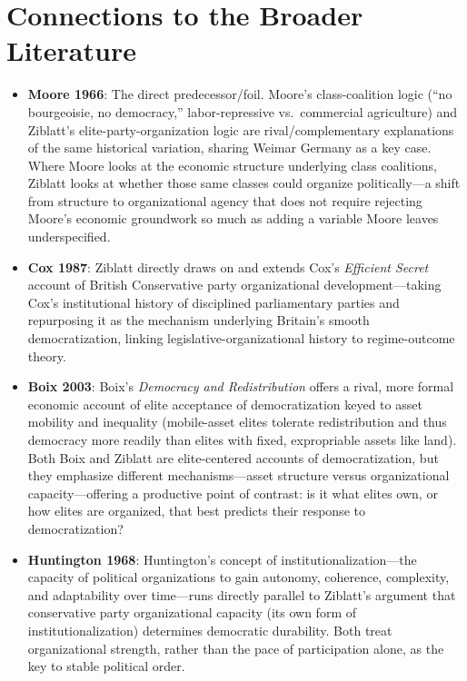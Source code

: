 \documentclass[12pt]{article}
\begin{document}
\section{Connections to the Broader Literature}

\begin{itemize}[leftmargin=*, itemsep=4pt]
    \item \textbf{Moore 1966}: The direct predecessor/foil. Moore's class-coalition logic (``no bourgeoisie, no democracy,'' labor-repressive vs.\ commercial agriculture) and Ziblatt's elite-party-organization logic are rival/complementary explanations of the same historical variation, sharing Weimar Germany as a key case. Where Moore looks at the economic structure underlying class coalitions, Ziblatt looks at whether those same classes could organize politically---a shift from structure to organizational agency that does not require rejecting Moore's economic groundwork so much as adding a variable Moore leaves underspecified.
    \item \textbf{Cox 1987}: Ziblatt directly draws on and extends Cox's \textit{Efficient Secret} account of British Conservative party organizational development---taking Cox's institutional history of disciplined parliamentary parties and repurposing it as the mechanism underlying Britain's smooth democratization, linking legislative-organizational history to regime-outcome theory.
    \item \textbf{Boix 2003}: Boix's \textit{Democracy and Redistribution} offers a rival, more formal economic account of elite acceptance of democratization keyed to asset mobility and inequality (mobile-asset elites tolerate redistribution and thus democracy more readily than elites with fixed, expropriable assets like land). Both Boix and Ziblatt are elite-centered accounts of democratization, but they emphasize different mechanisms---asset structure versus organizational capacity---offering a productive point of contrast: is it what elites own, or how elites are organized, that best predicts their response to democratization?
    \item \textbf{Huntington 1968}: Huntington's concept of institutionalization---the capacity of political organizations to gain autonomy, coherence, complexity, and adaptability over time---runs directly parallel to Ziblatt's argument that conservative party organizational capacity (its own form of institutionalization) determines democratic durability. Both treat organizational strength, rather than the pace of participation alone, as the key to stable political order.

\end{itemize}
\end{document}
